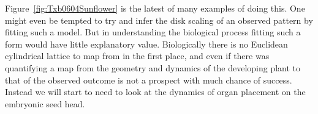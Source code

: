 Figure~\ref{fig:Txb0604Sunflower} is the latest of many examples of doing this. One might even be tempted to try and infer the disk scaling of an observed pattern by fitting such a model. 
But in understanding the biological process fitting such a form would have little explanatory value. Biologically there is no Euclidean cylindrical lattice to map from in the first place, and even if there was quantifying a map from the geometry and dynamics of the developing plant to that of the observed outcome is not a prospect with much chance of success. Instead we will start to need to look at the dynamics of organ placement on the embryonic seed head.  

